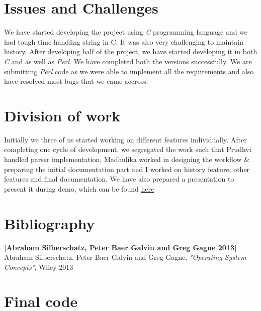 \documentclass[12pt,twoside]{article}
\begin{document}


\section{Issues and Challenges}
We have started developing the project using \emph{C} programming language and we had tough time handling string in C. It was also very challenging to maintain history. After developing half of the project, we have started developing it in both \emph{C} and as well as \emph{Perl}. We have completed both the versions successfully. We are submitting \emph{Perl} code as we were able to implement all the requirements and also have resolved most bugs that we came accross.

\section{Division of work}
Initially we three of us started working on different features individually. After completing one cycle of development, we segregated the work such that Prudhvi handled parser implementation, Madhulika worked in designing the workflow \& preparing the initial documentation part and I worked on history feature, other features and final documentation. We have also prepared a presentation to present it during demo, which can be found \href{http://prezi.com/io76sy9tsvnq/}{here}\\

\section{Bibliography}

\textbf{[Abraham Silberschatz, Peter Baer Galvin and Greg Gagne 2013]} Abraham Silberschatz, Peter Baer Galvin and Greg Gagne, \emph{"Operating System Concepts"}, Wiley 2013\\


\section{Final code}
\end{document}
